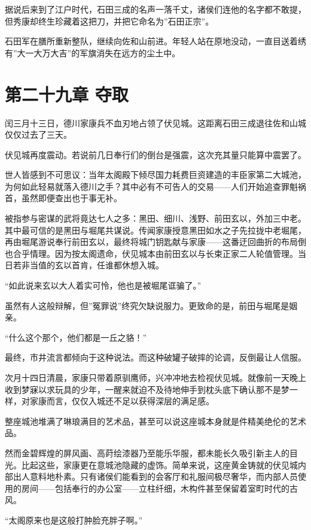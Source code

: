 \documentclass[
]{book}
\begin{document}
据说后来到了江户时代，石田三成的名声一落千丈，诸侯们连他的名字都不敢提，但秀康却终生珍藏着这把刀，并把它命名为''石田正宗''。

石田军在膳所重新整队，继续向佐和山前进。年轻人站在原地没动，一直目送着绣有''大一大万大吉''的军旗消失在远方的尘土中。

\chapter*{第二十九章 夺取}\label{ux7b2cux4e8cux5341ux4e5dux7ae0-ux593aux53d6}

闰三月十三日，德川家康兵不血刃地占领了伏见城。这距离石田三成退往佐和山城仅仅过去了三天。

伏见城再度震动。若说前几日奉行们的倒台是强震，这次充其量只能算中震罢了。

世人皆感到不可思议：当年太阁殿下倾尽国力耗费巨资建造的丰臣家第二大城池，为何如此轻易就落入德川之手？其中必有不可告人的交易------人们开始追查罪魁祸首，虽然即便查出也于事无补。

被指参与密谋的武将竟达七人之多：黑田、细川、浅野、前田玄以，外加三中老。其中最可信的是黑田与堀尾共谋说。传闻家康授意黑田如水之子先拉拢中老堀尾，再由堀尾游说奉行前田玄以，最终将城门钥匙献与家康------这番迂回曲折的布局倒也合乎情理。因为按太阁遗命，伏见城本由前田玄以与长束正家二人轮值管理。当日若非当值的玄以首肯，任谁都休想入城。

``如此说来玄以大人着实可怜，他也是被堀尾诓骗了。''

虽然有人这般辩解，但''冤罪说''终究欠缺说服力。更致命的是，前田与堀尾是姻亲。

``什么这个那个，他们都是一丘之貉！''

最终，市井流言都倾向于这种说法。而这种破罐子破摔的论调，反倒最让人信服。

次月十四日清晨，家康只带着原驯鹰师，兴冲冲地去检视伏见城。就像前一天晚上收到梦寐以求玩具的少年，一醒来就迫不及待地伸手到枕头底下确认那不是梦一样，对家康而言，仅仅入城还不足以获得深层的满足感。

整座城池堆满了琳琅满目的艺术品，甚至可以说这座城本身就是件精美绝伦的艺术品。

然而金碧辉煌的屏风画、高莳绘漆器乃至能乐华服，都未能长久吸引新主人的目光。比起这些，家康更在意城池隐藏的虚饰。简单来说，这座黄金铸就的伏见城内部出人意料地朴素。只有诸侯们能看到的会客厅和礼服间极尽奢华，而内部人员使用的房间------包括奉行的办公室------立柱纤细，木构件甚至保留着室町时代的古风。

``太阁原来也是这般打肿脸充胖子啊。''
\end{document}
